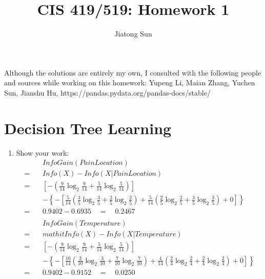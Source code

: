 \documentclass{article}
\title{CIS 419/519: Homework 1}
\author{Jiatong Sun}
\date{}
\begin{document}
    \maketitle
    Although the solutions are entirely my own, I consulted with the following people and sources while working on this homework: Yupeng Li, Maian Zhang, Yuchen Sun, Jianshu Hu, https://pandas.pydata.org/pandas-docs/stable/
    
    \section{Decision Tree Learning}
        \begin{enumerate}[label=\alph*.]
            \item %
            Show your work:
            \begin{equation*}
            	\begin{split}
                &\mathit{InfoGain}(\mathit{PainLocation})\\
                =\quad&\mathit{Info(X)-Info(X|			
                PainLocation)}\\
                =\quad&[-(\frac{9}{14}\log_2\frac{9}{14}+
                \frac{5}{14}\log_2\frac{5}{14})]\\
                \quad&-\left\{-[\frac{5}{14}
                (\frac{3}{5}\log_2\frac{3}{5}+
                \frac{2}{5}\log_2\frac{2}{5})+
                \frac{5}{14}
                (\frac{2}{5}\log_2\frac{2}{5}+
                \frac{3}{5}\log_2\frac{3}{5})+0
                ]\right\}\\
                =\quad&0.9402-0.6935\quad
                =\quad0.2467\\\\
                &\mathit{InfoGain}(\mathit{Temperature})\\
                =\quad&mathit{Info(X)
                -Info(X|Temperature)}\\
                =\quad&[-(\frac{9}{14}\log_2\frac{9}{14}+
                \frac{5}{14}\log_2\frac{5}{14})]\\
                \quad&-\left\{-[\frac{10}{14}
                (\frac{3}{10}\log_2\frac{3}{10}+
                \frac{7}{10}\log_2\frac{7}{10})+
                \frac{4}{14}
                (\frac{2}{4}\log_2\frac{2}{4}+
                \frac{2}{4}\log_2\frac{2}{4})+0
                ]\right\}\\
                =\quad&0.9402-0.9152\quad
                =\quad0.0250
                \end{split}
            \end{equation*}
            

\end{enumerate}
\end{document}
